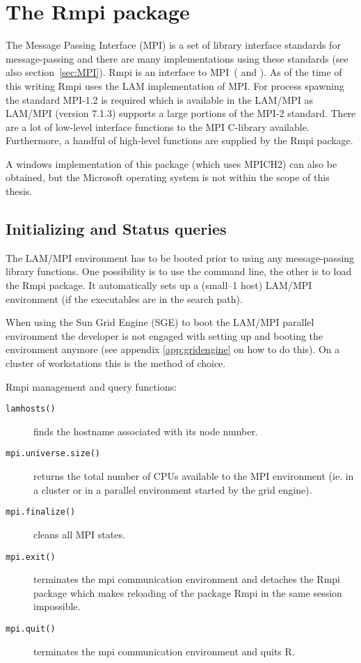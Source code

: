 \section{The Rmpi package}
\label{sec:Rmpi}
The Message Passing Interface (MPI) is a set of library interface
standards for message-passing and there are many implementations using
these standards (see also section~\ref{sec:MPI}).
Rmpi is an interface to MPI~(\cite{yu02Rmpi} and \cite{yu06Rmpi}). As
of the time of this writing Rmpi uses
the LAM implementation of MPI. For process spawning the standard
MPI-1.2 is required which is available in the LAM/MPI 
as LAM/MPI (version 7.1.3) supports a large portions of the MPI-2
standard. There are 
a lot of low-level interface functions to the MPI C-library available.
Furthermore, a handful of high-level functions are supplied by the
Rmpi package. 

A windows implementation of this package (which uses MPICH2)
can also be obtained, but the Microsoft operating system is not within the
scope of this thesis.

\subsection{Initializing and Status queries}

The LAM/MPI environment has to be booted prior to using any
message-passing library functions. One possibility is to use the
command line, the other is to load the Rmpi package. It automatically
sets up a (small--1 host) LAM/MPI environment (if the executables are
in the search path). 

When using the Sun Grid Engine (SGE) to boot the LAM/MPI parallel
environment the developer is not engaged with
setting up and booting the environment anymore (see
appendix \ref{app:gridengine} on how to do this). On a cluster of
workstations this is the method of choice. 


Rmpi management and query functions:

\begin{description}
\item[\texttt{lamhosts()}] finds the hostname associated with its node
  number.
\item[\texttt{mpi.universe.size()}] returns the total number of CPUs
  available to the MPI environment (ie. in a cluster or in a parallel
  environment started by the grid engine).
\item[\texttt{mpi.finalize()}] cleans all MPI states.
\item[\texttt{mpi.exit()}] terminates the mpi communication
  environment and detaches the Rmpi package which makes reloading of
  the package Rmpi in the same session impossible.  
\item[\texttt{mpi.quit()}] terminates the mpi communication
  environment and quits R.  
\end{description}
  

